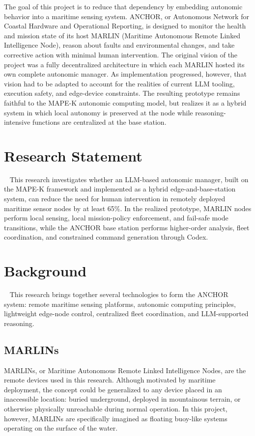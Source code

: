 \documentclass[journal]{IEEEtran}
\begin{document}
The goal of this project is to reduce that dependency by embedding autonomic behavior into a maritime sensing system. ANCHOR, or Autonomous Network for Coastal Hardware and Operational Reporting, is designed to monitor the health and mission state of its host MARLIN (Maritime Autonomous Remote Linked Intelligence Node), reason about faults and environmental changes, and take corrective action with minimal human intervention. The original vision of the project was a fully decentralized architecture in which each MARLIN hosted its own complete autonomic manager. As implementation progressed, however, that vision had to be adapted to account for the realities of current LLM tooling, execution safety, and edge-device constraints. The resulting prototype remains faithful to the MAPE-K autonomic computing model, but realizes it as a hybrid system in which local autonomy is preserved at the node while reasoning-intensive functions are centralized at the base station.

\section{Research Statement}~\label{statement}
This research investigates whether an LLM-based autonomic manager, built on the MAPE-K framework and implemented as a hybrid edge-and-base-station system, can reduce the need for human intervention in remotely deployed maritime sensor nodes by at least 65\%. In the realized prototype, MARLIN nodes perform local sensing, local mission-policy enforcement, and fail-safe mode transitions, while the ANCHOR base station performs higher-order analysis, fleet coordination, and constrained command generation through Codex.

\section{Background}~\label{background}
This research brings together several technologies to form the ANCHOR system: remote maritime sensing platforms, autonomic computing principles, lightweight edge-node control, centralized fleet coordination, and LLM-supported reasoning.

\subsection{MARLINs}
MARLINs, or Maritime Autonomous Remote Linked Intelligence Nodes, are the remote devices used in this research. Although motivated by maritime deployment, the concept could be generalized to any device placed in an inaccessible location: buried underground, deployed in mountainous terrain, or otherwise physically unreachable during normal operation. In this project, however, MARLINs are specifically imagined as floating buoy-like systems operating on the surface of the water.
\end{document}
